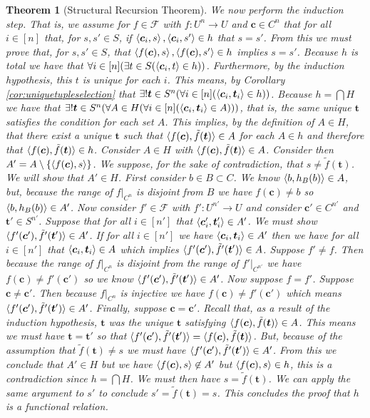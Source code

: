 \documentclass[12pt]{article}
\theoremstyle{break}
\theoremstyle{break}
\newtheorem{theorem}{Theorem}[section]
\theoremstyle{break}
\theoremstyle{break}
\theoremstyle{break}
\newtheorem{informal definition}[definition]{Informal Definition}
\newcommand{\bv}[1]{\boldsymbol{#1}}
\begin{document}
\begin{theorem}[Structural Recursion Theorem]
We now perform the induction step.
That is, we assume for $f\in \mathcal{F}$ with $f:U^n \to U$ and $\bv{c}\in C^n$ that for all $i\in [n]$ that, for $s, s' \in S$,  if $\braket{\bv{c}_i, s}, \braket{\bv{c}_i, s'} \in h$ that $s=s'$.
From this we must prove that, for $s, s'\in S$, that $\braket{f(\bv{c}), s}, \braket{f(\bv{c}), s'} \in h$ implies $s=s'$.
Because $h$ is total we have that $\forall i \in [n] (\exists t\in S(\braket{\bv{c}_i, t}\in h))$.
Furthermore, by the induction hypothesis, this $t$ is unique for each $i$.
This means, by Corollary \ref{cor:uniquetupleselection} that $\exists! \bv{t}\in S^n (\forall i \in [n](\braket{\bv{c}_i, \bv{t}_i}\in h))$.
Because $h = \bigcap H$ we have that $\exists! \bv{t}\in S^n (\forall A \in H(\forall i \in [n](\braket{\bv{c}_i, \bv{t}_i} \in A)))$, that is, the same unique $\bv{t}$ satisfies the condition for each set $A$.
This implies, by the definition of $A\in H$, that there exist a unique $\bv{t}$ such that $\braket{f(\bv{c}), \tilde{f}(\bv{t})} \in A$ for each $A\in h$ and therefore that $\braket{f(\bv{c}), \tilde{f}(\bv{t})}\in h$.
Consider $A\in H$ with $\braket{f(\bv{c}), \tilde{f}(\bv{t})}\in A$.
Consider then $A' = A\setminus \{\braket{f(\bv{c}), s}\}$.
We suppose, for the sake of contradiction, that $s \not = \tilde{f}(\bv{t})$.
We will show that $A' \in H$.
First consider $b\in B \subset C$.
We know $\braket{b, h_B(b)} \in A$, but, because the range of $f|_{C^n}$ is disjoint from $B$ we have $f(\bv{c}) \not = b$ so $\braket{b, h_B(b)}\in A'$.
Now consider $f'\in \mathcal{F}$ with $f':U^{n'} \to U$ and consider $\bv{c}' \in C^{n'}$ and $\bv{t}'\in S^{n'}$.
Suppose that for all $i \in [n']$ that $\braket{\bv{c}'_i, \bv{t}'_i} \in A'$.
We must show $\braket{f'(\bv{c}'), \tilde{f}'(\bv{t}')} \in A'$.
If for all $i\in [n']$ we have $\braket{\bv{c}_i, \bv{t}_i}\in A'$ then we have for all $i \in [n']$ that $\braket{\bv{c}_i, \bv{t}_i}\in A$ which implies $\braket{f'(\bv{c}'), \tilde{f}'(\bv{t}')} \in A$.
Suppose $f' \not = f$.
Then because the range of $f|_{C^n}$ is disjoint from the range of $f'|_{C^{n'}}$ we have $f(\bv{c}) \not = f'(\bv{c}')$ so we know $\braket{f'(\bv{c}'), \tilde{f}'(\bv{t}')} \in A'$.
Now suppose $f=f'$.
Suppose $\bv{c} \not = \bv{c}'$.
Then because $f|_{C^n}$ is injective we have $f(\bv{c}) \not = f'(\bv{c'})$ which means $\braket{f'(\bv{c}'), \tilde{f}'(\bv{t}')} \in A'$.
Finally, suppose $\bv{c} = \bv{c'}$.
Recall that, as a result of the induction hypothesis, $\bv{t}$ was the unique $\bv{t}$ satisfying $\braket{f(\bv{c}), \tilde{f}(\bv{t})} \in A$.
This means we must have $\bv{t} = \bv{t}'$ so that $\braket{f'(\bv{c}'), \tilde{f}'(\bv{t}')} = \braket{f(\bv{c}), \tilde{f}(\bv{t})}$.
But, because of the assumption that $\tilde{f}(\bv{t}) \not = s$ we must have $\braket{f'(\bv{c}'), \tilde{f}'(\bv{t}')} \in A'$.
From this we conclude that $A'\in H$ but we have $\braket{f(\bv{c}), s} \not \in A'$ but $\braket{f(\bv{c}), s}\in h$, this is a contradiction since $h = \bigcap H$.
We must then have $s = \tilde{f}(\bv{t})$.
We can apply the same argument to $s'$ to conclude $s' = \tilde{f}(\bv{t}) = s$.
This concludes the proof that $h$ is a functional relation.


\end{theorem}
\end{document}
